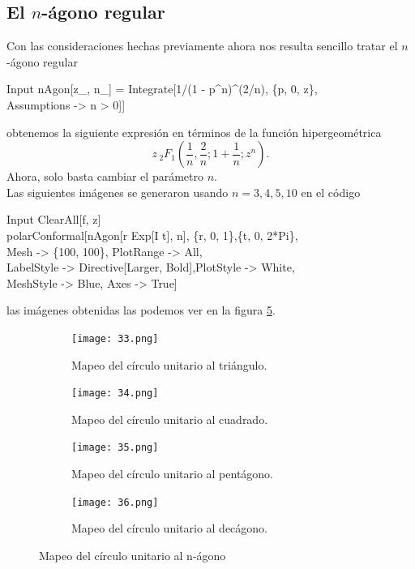 \subsection{El $n$-ágono regular}
Con las consideraciones hechas previamente ahora nos resulta sencillo tratar el $n$-ágono regular
\begin{mmaCell}{Input}
	 nAgon[z_, n_] = Integrate[1/(1 - p^n)^(2/n), \{p, 0, z\},\\Assumptions -> n > 0]]
\end{mmaCell} 
obtenemos la siguiente expresión en términos de la función hipergeométrica
$$z \, _2F_1\left(\dfrac{1}{n},\dfrac{2}{n};1+\dfrac{1}{n};z^n\right).$$
Ahora, solo basta cambiar el parámetro $n$.\\
Las siguientes imágenes se generaron usando $n=3,4,5,10$ en el código
\begin{mmaCell}{Input}
	 ClearAll[f, z]\\polarConformal[nAgon[r Exp[I t], n], \{r, 0, 1\},\{t, 0, 2*Pi\},\\Mesh -> \{100, 100\}, PlotRange -> All,\\LabelStyle -> Directive[Larger, Bold],PlotStyle -> White,\\MeshStyle -> Blue, Axes -> True]
\end{mmaCell}
las imágenes obtenidas las podemos ver en la figura \ref{fig:Mapeo del círculo unitario al n-ágono}. \newpage
\begin{figure}[htbp]
	\centering
	\begin{subfigure}{0.45\textwidth}
		\texttt{[image: 33.png]}
		\caption{Mapeo del círculo unitario al triángulo.}
		\label{fig:Mapeo del círculo unitario al triángulo.}
	\end{subfigure}
	\begin{subfigure}{0.45\textwidth}
		\texttt{[image: 34.png]}
		\caption{Mapeo del círculo unitario al cuadrado.}
		\label{fig:Mapeo del círculo unitario al cuadrado}
	\end{subfigure}
	
	\begin{subfigure}{0.45\textwidth}
		\texttt{[image: 35.png]}
		\caption{Mapeo del círculo unitario al pentágono.}
		\label{fig:Mapeo del círculo unitario al pentágono}
	\end{subfigure}
	\begin{subfigure}{0.45\textwidth}
		\texttt{[image: 36.png]}
		\caption{Mapeo del círculo unitario al decágono.}
		\label{fig:Mapeo del círculo unitario al decágono}
	\end{subfigure}
	\caption{Mapeo del círculo unitario al n-ágono}
	\label{fig:Mapeo del círculo unitario al n-ágono}
\end{figure}

